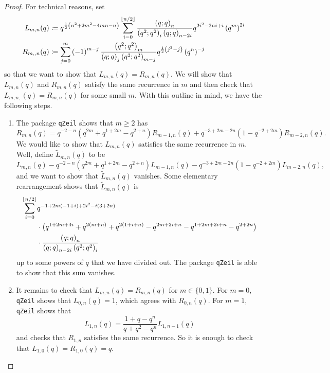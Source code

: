 \begin{proof}
    For technical reasons, set
    \begin{align*}
        L_{m,n}(q)&\coloneqq q^{\frac{1}{2}\left(n^{2}+2m^{2}-4mn-n\right)}\sum_{i=0}^{\left\lfloor{n/2}\right\rfloor}\frac{\left(q;q\right)_n}{\left(q^{2};q^{2}\right)_i\left(q;q\right)_{n-2i}}q^{2i^{2}-2ni+i}\left(q^{m}\right)^{2i} \\
        R_{m,,n}(q)&\coloneqq\sum_{j=0}^{m}\left(-1\right)^{m-j}\frac{\left(q^{2};q^{2}\right)_m}{\left(q;q\right)_j\left(q^{2};q^{2}\right)_{m-j}}q^{\frac{1}{2}\left(j^{2}-j\right)}\left(q^{n}\right)^{-j}
    \end{align*}
    so that we want to show that $L_{m,n}(q)=R_{m,n}(q)$. We will show that $L_{m,n}(q)$ and $R_{m,n}(q)$ satisfy the same recurrence in $m$ and then check that $L_{m,n,}(q)=R_{m,n}(q)$ for some small $m$. With this outline in mind, we have the following steps.
    \begin{enumerate}
        \item The package \texttt{qZeil} shows that $m\ge2$ has
        \[R_{m,n}(q)=q^{-2-n}\left(q^{2m}+q^{1+2m}-q^{2+n}\right)R_{m-1,n}(q)+q^{-3+2m-2n}\left(1-q^{-2+2m}\right)R_{m-2,n}(q).\]
        We would like to show that $L_{m,n}(q)$ satisfies the same recurrence in $m$. Well, define $\widetilde L_{m,n}(q)$ to be
        \[L_{m,n}(q)-q^{-2-n}\left(q^{2m}+q^{1+2m}-q^{2+n}\right)L_{m-1,n}(q)-q^{-3+2m-2n}\left(1-q^{-2+2m}\right)L_{m-2,n}(q),\]
        and we want to show that $\widetilde L_{m,n}(q)$ vanishes. Some elementary rearrangement shows that $\widetilde L_{m,n}(q)$ is
        \begin{align*}
            \sum_{i=0}^{\left\lfloor{n/2}\right\rfloor}&q^{-1+2m\left(-1+i\right)+2i^{2}-i\left(3+2n\right)} \\
            &\cdot \big(q^{1+2m+4i}+q^{2\left(m+n\right)}+q^{2\left(1+i+n\right)}-q^{2m+2i+n}-q^{1+2m+2i+n}-q^{2+2n}\big) \\
            &\cdot\frac{\left(q;q\right)_n}{\left(q;q\right)_{n-2i}\left(q^{2};q^{2}\right)_i}
        \end{align*}
        up to some powers of $q$ that we have divided out. The package \texttt{qZeil} is able to show that this sum vanishes.
        \item It remains to check that $L_{m,n}(q)=R_{m,n}(q)$ for $m\in\{0,1\}$. For $m=0$, \texttt{qZeil} shows that $L_{0,n}(q)=1$, which agrees with $R_{0,n}(q)$. For $m=1$, \texttt{qZeil} shows that
        \[L_{1,n}(q)=\frac{1+q-q^n}{q+q^2-q^n}L_{1,n-1}(q)\]
        and checks that $R_{1,n}$ satisfies the same recurrence. So it is enough to check that $L_{1,0}(q)=R_{1,0}(q)=q$.
        \qedhere
    \end{enumerate}
\end{proof}
